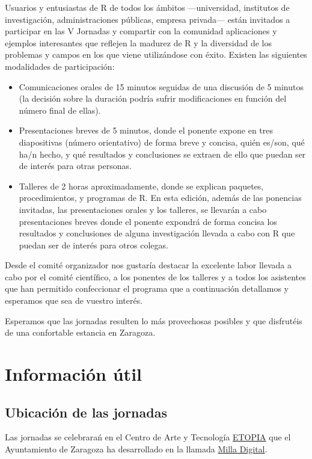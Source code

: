 Usuarios y entusiastas de R de todos los ámbitos —universidad,
institutos de investigación, administraciones públicas, empresa
privada— están invitados a participar en las V Jornadas y compartir
con la comunidad aplicaciones y ejemplos interesantes que reflejen la
madurez de R y la diversidad de los problemas y campos en los que
viene utilizándose con éxito. Existen las siguientes modalidades de
participación:
\begin{itemize}
\item Comunicaciones orales de 15 minutos seguidas de una discusión de
  5 minutos (la decisión sobre la duración podría sufrir
  modificaciones en función del número final de ellas).

\item Presentaciones breves de 5 minutos, donde el ponente expone en
  tres diapositivas (número orientativo) de forma breve y concisa,
  quién es/son, qué ha/n hecho, y qué resultados y conclusiones se
  extraen de ello que puedan ser de interés para otras personas.

\item Talleres de 2 horas aproximadamente, donde se explican paquetes,
  procedimientos, y programas de R.  En esta edición, además de las
  ponencias invitadas, las presentaciones orales y los talleres, se
  llevarán a cabo presentaciones breves donde el ponente expondrá de
  forma concisa los resultados y conclusiones de alguna investigación
  llevada a cabo con R que puedan ser de interés para otros colegas.
\end{itemize}

Desde el comité organizador nos gustaría destacar la excelente labor
llevada a cabo por el comité científico, a los ponentes de los
talleres y a todos los asistentes que han permitido confeccionar el
programa que a continuación detallamos y esperamos que sea de vuestro
interés.

Esperamos que las jornadas resulten lo más provechosas posibles y que
disfrutéis de una confortable estancia en Zaragoza.


\chapter{Información útil}

\section{Ubicación de las jornadas}

Las jornadas se celebrarań en el Centro de Arte y Tecnología 
\href{http://www.zaragoza.es/ciudad/idezar/detalle_Centro?id=5105}{ETOPIA}
que  el Ayuntamiento de Zaragoza ha desarrollado en la llamada 
\href{http://www.milladigital.es/espanol/home.php}{Milla Digital}. 

